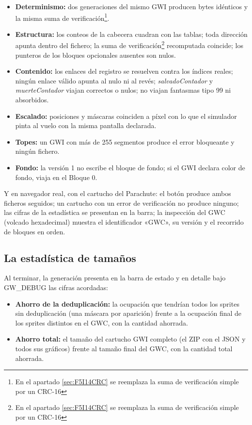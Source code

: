 \begin{itemize}
	\item \textbf{Determinismo:} dos generaciones del mismo GWI
	producen bytes idénticos y la misma suma de verificación\footnote{En el apartado \ref{sec:F5I14CRC} se reemplaza la suma de verificación simple por un CRC-16}.
	\item \textbf{Estructura:} los conteos de la cabecera cuadran con
	las tablas; toda dirección apunta dentro del fichero; la suma de
	verificación\footnote{En el apartado \ref{sec:F5I14CRC} se reemplaza la suma de verificación simple por un CRC-16} recomputada coincide; los punteros de los bloques
	opcionales ausentes son nulos.
	\item \textbf{Contenido:} los enlaces del registro se resuelven
	contra los índices reales; ningún enlace válido apunta al nulo ni
	al revés; \emph{salvadoContador} y \emph{muerteContador} viajan
	correctos o nulos; no viajan fantasmas tipo 99 ni absorbidos.
	\item \textbf{Escalado:} posiciones y máscaras coinciden a píxel
	con lo que el simulador pinta al vuelo con la misma pantalla
	declarada.
	\item \textbf{Topes:} un GWI con más de 255 segmentos produce el
	error bloqueante y ningún fichero.
	\item \textbf{Fondo:} la versión 1 no escribe el bloque de fondo;
	si el GWI declara color de fondo, viaja en el Bloque 0.
\end{itemize}

Y en navegador real, con el cartucho del Parachute: el botón produce
ambos ficheros seguidos; un cartucho con un error de verificación no
produce ninguno; las cifras de la estadística se presentan en la
barra; la inspección del GWC (volcado hexadecimal) muestra el
identificador «GWC», su versión y el recorrido de bloques en orden.

\subsection{La estadística de tamaños}
\label{sec:F5I3Estadistica}

Al terminar, la generación presenta en la barra de estado y en
detalle bajo GW\_DEBUG las cifras acordadas:

\begin{itemize}
	\item \textbf{Ahorro de la deduplicación:} la ocupación que
	tendrían todos los sprites sin deduplicación (una máscara por
	aparición) frente a la ocupación final de los sprites distintos en
	el GWC, con la cantidad ahorrada.
	\item \textbf{Ahorro total:} el tamaño del cartucho GWI completo
	(el ZIP con el JSON y todos sus gráficos) frente al tamaño final
	del GWC, con la cantidad total ahorrada.
\end{itemize}

